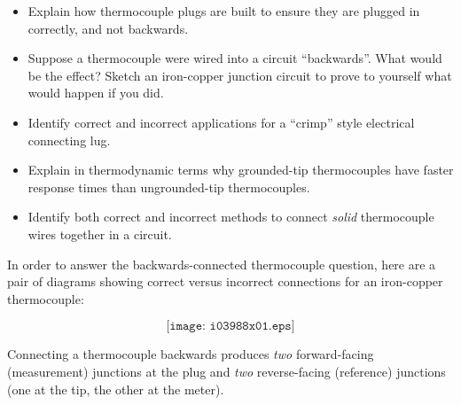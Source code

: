 \begin{itemize}
\item{} Explain how thermocouple plugs are built to ensure they are plugged in correctly, and not backwards.
\item{} Suppose a thermocouple were wired into a circuit ``backwards''.  What would be the effect?  Sketch an iron-copper junction circuit to prove to yourself what would happen if you did.
\item{} Identify correct and incorrect applications for a ``crimp'' style electrical connecting lug.
\item{} Explain in thermodynamic terms why grounded-tip thermocouples have faster response times than ungrounded-tip thermocouples.
\item{} Identify both correct and incorrect methods to connect {\it solid} thermocouple wires together in a circuit.
\end{itemize}







\vfil \eject

In order to answer the backwards-connected thermocouple question, here are a pair of diagrams showing correct versus incorrect connections for an iron-copper thermocouple:

$$\texttt{[image: i03988x01.eps]}$$

Connecting a thermocouple backwards produces {\it two} forward-facing (measurement) junctions at the plug and {\it two} reverse-facing (reference) junctions (one at the tip, the other at the meter).





